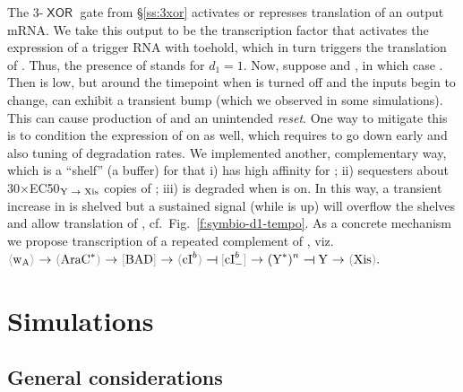 \documentclass[12pt,notitlepage]{article}
\newcommand{\XOR}{\ensuremath{\mathop{\mathsf{XOR}}}\xspace}
\newcommand{\cbra}[1]{{\ensuremath{\color{gray}{#1}}}}
\newcommand{\signal}[1]{{{\cbra{\langle}\ce{#1}\cbra{\rangle}}}}
\newcommand{\protein}[1]{{{\cbra{(}\ce{#1}\cbra{)}}}}
\newcommand{\promoter}[1]{{{\cbra{[}\ce{#1}\cbra{]}}}}
\newcommand{\act}{\ {\ensuremath{\mathbin{\to}}}\ }
\newcommand{\rep}{\ {\ensuremath{\mathrel{\raisebox{-.3ex}{\rotatebox{90}{\scalebox{1}[1.2]{$\bot$}}}}}}\ }
\begin{document}
The 3-\XOR gate from \S\ref{ss:3xor}
activates or represses translation of an output mRNA.
%
We take this output to be 
the transcription factor 
that activates the expression of 
a trigger RNA  with toehold,
which 
in turn triggers the translation of .
%
Thus, the presence of  stands for $d_1 = 1$.
%
%
%
Now, suppose
 and ,
in which case .
%
%
Then  is low,
but
around the timepoint when 
 is turned off
and the inputs begin to change,
 can exhibit a transient bump
(which we observed in some simulations).
%
This can cause production of 
and 
an unintended \emph{reset}.
%
One way to mitigate this is to condition 
the expression of 
on  as well,
which requires  to go down early
and also tuning of degradation rates.
%
We implemented another, complementary way,
which
is a ``shelf'' (a buffer) for 
that 
%
i)
has high affinity for ;
%
ii)
sequesters 
about 
30$\times$EC50${}_\text{\ce{Y}\act\ce{Xis}}$
copies of ;
%
iii)
is degraded when  is on.
%
In this way, 
a transient increase in  is shelved
but a sustained signal 
(while  is up)
will overflow the shelves and 
allow
translation of ,
cf.~Fig.~\ref{f:symbio-d1-tempo}.
%
%
%
%
As a concrete mechanism
we propose
transcription of 
a repeated complement of ,
viz.~%
$
	\signal{\ce{w_A}} \act \protein{AraC^*} \act \promoter{BAD} 
	\act 
	\protein{cI^b} \rep \promoter{cI^b_-} \act
	\ce{(Y^*)^n}
	\rep 
	\ce{Y} \act \protein{Xis}
	.
$
%



\section{Simulations}

\subsection{General considerations}
\end{document}
